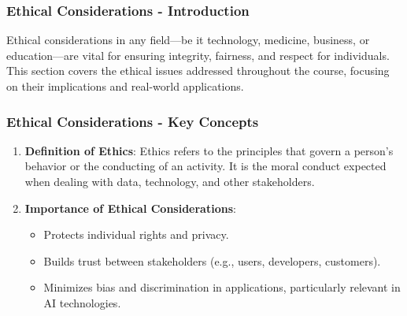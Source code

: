\documentclass[aspectratio=169]{beamer}
\begin{document}
\begin{frame}[fragile]
    \frametitle{Ethical Considerations - Introduction}
    Ethical considerations in any field—be it technology, medicine, business, or education—are vital for ensuring integrity, fairness, and respect for individuals. This section covers the ethical issues addressed throughout the course, focusing on their implications and real-world applications.
\end{frame}

\begin{frame}[fragile]
    \frametitle{Ethical Considerations - Key Concepts}
    \begin{enumerate}
        \item \textbf{Definition of Ethics}: 
            Ethics refers to the principles that govern a person's behavior or the conducting of an activity. It is the moral conduct expected when dealing with data, technology, and other stakeholders.
        
        \item \textbf{Importance of Ethical Considerations}:
            \begin{itemize}
                \item Protects individual rights and privacy.
                \item Builds trust between stakeholders (e.g., users, developers, customers).
                \item Minimizes bias and discrimination in applications, particularly relevant in AI technologies.
            \end{itemize}
    \end{enumerate}
\end{frame}
\end{document}

